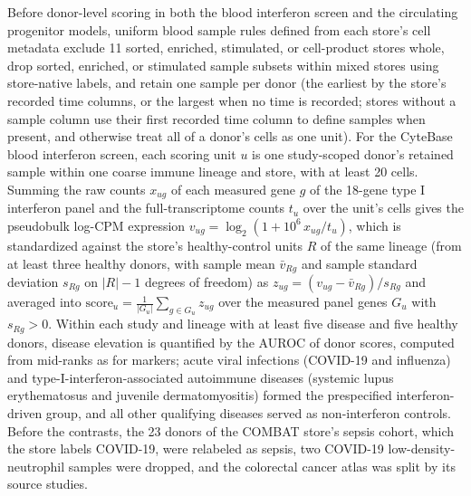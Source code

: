 \documentclass[11pt]{article}
\begin{document}
Before donor-level scoring in both the blood interferon screen and the circulating progenitor models, uniform blood sample rules defined from each store's cell metadata exclude 11 sorted, enriched, stimulated, or cell-product stores whole, drop sorted, enriched, or stimulated sample subsets within mixed stores using store-native labels, and retain one sample per donor (the earliest by the store's recorded time columns, or the largest when no time is recorded; stores without a sample column use their first recorded time column to define samples when present, and otherwise treat all of a donor's cells as one unit). For the CyteBase blood interferon screen, each scoring unit $u$ is one study-scoped donor's retained sample within one coarse immune lineage and store, with at least 20 cells. Summing the raw counts $x_{ug}$ of each measured gene $g$ of the 18-gene type I interferon panel and the full-transcriptome counts $t_u$ over the unit's cells gives the pseudobulk log-CPM expression $v_{ug}=\log_{2}(1+10^{6}\,x_{ug}/t_u)$, which is standardized against the store's healthy-control units $R$ of the same lineage (from at least three healthy donors, with sample mean $\bar v_{Rg}$ and sample standard deviation $s_{Rg}$ on $|R|-1$ degrees of freedom) as $z_{ug}=(v_{ug}-\bar v_{Rg})/s_{Rg}$ and averaged into $\mathrm{score}_u=\frac{1}{\lvert G_u\rvert}\sum_{g\in G_u}z_{ug}$ over the measured panel genes $G_u$ with $s_{Rg}>0$. Within each study and lineage with at least five disease and five healthy donors, disease elevation is quantified by the AUROC of donor scores, computed from mid-ranks as for markers; acute viral infections (COVID-19 and influenza) and type-I-interferon-associated autoimmune diseases (systemic lupus erythematosus and juvenile dermatomyositis) formed the prespecified interferon-driven group, and all other qualifying diseases served as non-interferon controls. Before the contrasts, the 23 donors of the COMBAT store's sepsis cohort, which the store labels COVID-19, were relabeled as sepsis, two COVID-19 low-density-neutrophil samples were dropped, and the colorectal cancer atlas was split by its source studies.
\end{document}
